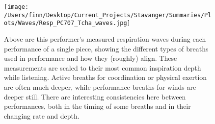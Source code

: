 \begin{figure}[h]
\begin{center}
\texttt{[image: /Users/finn/Desktop/Current\_Projects/Stavanger/Summaries/Plots/Waves/Resp\_PC707\_Tcha\_waves.jpg]}
\caption{Above are this performer's measured respiration waves during each performance of a single piece, showing the different types of breaths used in performance and how they (roughly) align.  These measurements are scaled to their most common inspiration depth while listening. Active breaths for coordination or physical exertion are often much deeper, while performance breaths for winds are deeper still. There are interesting consistencies here between performances, both in the timing of some breaths and in their changing rate and depth.}
\label{Waves}
\end{center}
\end{figure}
